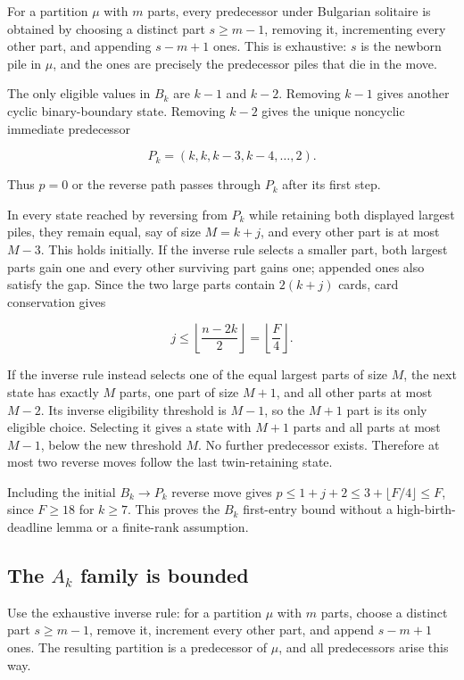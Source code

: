 \documentclass[11pt,a4paper]{article}
\begin{document}
For a partition $\mu$ with $m$ parts, every predecessor under Bulgarian solitaire is obtained by choosing a distinct part $s\ge m-1$, removing it, incrementing every other part, and appending $s-m+1$ ones. This is exhaustive: $s$ is the newborn pile in $\mu$, and the ones are precisely the predecessor piles that die in the move.

The only eligible values in $B_k$ are $k-1$ and $k-2$. Removing $k-1$ gives another cyclic binary-boundary state. Removing $k-2$ gives the unique noncyclic immediate predecessor

\[
P_k=(k,k,k-3,k-4,\ldots,2).
\]

Thus $p=0$ or the reverse path passes through $P_k$ after its first step.

In every state reached by reversing from $P_k$ while retaining both displayed largest piles, they remain equal, say of size $M=k+j$, and every other part is at most $M-3$. This holds initially. If the inverse rule selects a smaller part, both largest parts gain one and every other surviving part gains one; appended ones also satisfy the gap. Since the two large parts contain $2(k+j)$ cards, card conservation gives

\[
j\le\left\lfloor\frac{n-2k}{2}\right\rfloor
 =\left\lfloor\frac{F}{4}\right\rfloor.
\]

If the inverse rule instead selects one of the equal largest parts of size $M$, the next state has exactly $M$ parts, one part of size $M+1$, and all other parts at most $M-2$. Its inverse eligibility threshold is $M-1$, so the $M+1$ part is its only eligible choice. Selecting it gives a state with $M+1$ parts and all parts at most $M-1$, below the new threshold $M$. No further predecessor exists. Therefore at most two reverse moves follow the last twin-retaining state.

Including the initial $B_k\to P_k$ reverse move gives $p\le1+j+2\le3+\lfloor F/4\rfloor\le F$, since $F\ge18$ for $k\ge7$. This proves the $B_k$ first-entry bound without a high-birth-deadline lemma or a finite-rank assumption.

\subsection{The $A_k$ family is bounded}

Use the exhaustive inverse rule: for a partition $\mu$ with $m$ parts, choose a distinct part $s\ge m-1$, remove it, increment every other part, and append $s-m+1$ ones. The resulting partition is a predecessor of $\mu$, and all predecessors arise this way.
\end{document}
